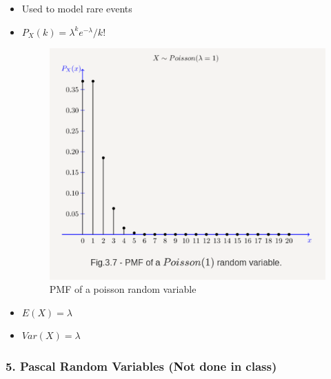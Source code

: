 \begin{itemize}
\item
  Used to model rare events
\item
  \(P_X(k) = \lambda^ke^{-\lambda}/k!\)

  \begin{figure}[''h!'']
  \centering
  \includegraphics{Lecture 13 Notes e842fef9a3e0449fa78bac59b75dbc5c/Screenshot_from_2021-08-06_23-13-10.png}
  \caption{PMF of a poisson random variable}
  \end{figure}
\item
  \(E(X) = \lambda\)
\item
  \(Var(X) =\lambda\)
\end{itemize}

\hypertarget{pascal-random-variables-not-done-in-class}{%
\subsubsection{5. Pascal Random Variables (Not done in
class)}\label{pascal-random-variables-not-done-in-class}}

